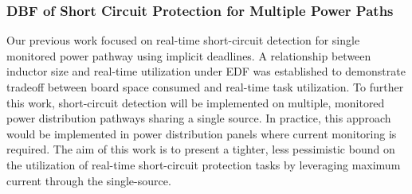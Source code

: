 \subsubsection{DBF of Short Circuit Protection for Multiple Power Paths}

Our previous work focused on real-time short-circuit detection for single monitored power pathway using implicit deadlines\cite{willcock_trading_2017}.
A relationship between inductor size and real-time utilization under EDF was established to demonstrate tradeoff between board space consumed and real-time task utilization.
To further this work, short-circuit detection will be implemented on multiple, monitored power distribution pathways sharing a single source.
In practice, this approach would be implemented in power distribution panels where current monitoring is required.
The aim of this work is to present a tighter, less pessimistic bound on the utilization of real-time short-circuit protection tasks by leveraging maximum current through the single-source.

